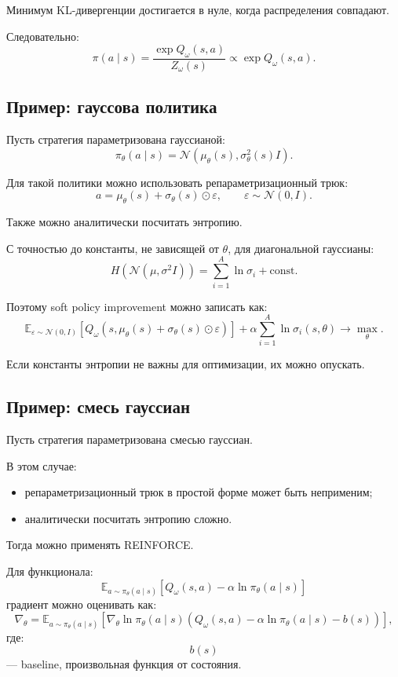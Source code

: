 \documentclass[12pt,a4paper]{article}
\begin{document}
Минимум KL-дивергенции достигается в нуле, когда распределения совпадают.

Следовательно:
\[
\pi(a\mid s)
=
\frac{
\exp Q_\omega(s,a)
}{
Z_\omega(s)
}
\propto
\exp Q_\omega(s,a).
\]

\subsection{Пример: гауссова политика}

Пусть стратегия параметризована гауссианой:
\[
\pi_\theta(a\mid s)
=
\mathcal N
\left(
\mu_\theta(s),
\sigma_\theta^2(s)I
\right).
\]

Для такой политики можно использовать репараметризационный трюк:
\[
a
=
\mu_\theta(s)
+
\sigma_\theta(s)\odot\varepsilon,
\qquad
\varepsilon\sim\mathcal N(0,I).
\]

Также можно аналитически посчитать энтропию.

С точностью до константы, не зависящей от $\theta$, для диагональной гауссианы:
\[
H
\left(
\mathcal N(\mu,\sigma^2 I)
\right)
=
\sum_{i=1}^{A}
\ln\sigma_i
+
\mathrm{const}.
\]

Поэтому soft policy improvement можно записать как:
\[
\mathbb E_{\varepsilon\sim\mathcal N(0,I)}
\left[
Q_\omega
\left(
s,
\mu_\theta(s)+\sigma_\theta(s)\odot\varepsilon
\right)
\right]
+
\alpha
\sum_{i=1}^{A}
\ln\sigma_i(s,\theta)
\to
\max_{\theta}.
\]

Если константы энтропии не важны для оптимизации, их можно опускать.

\subsection{Пример: смесь гауссиан}

Пусть стратегия параметризована смесью гауссиан.

В этом случае:
\begin{itemize}
    \item репараметризационный трюк в простой форме может быть неприменим;
    \item аналитически посчитать энтропию сложно.
\end{itemize}

Тогда можно применять REINFORCE.

Для функционала:
\[
\mathbb E_{a\sim\pi_\theta(a\mid s)}
\left[
Q_\omega(s,a)
-
\alpha\ln\pi_\theta(a\mid s)
\right]
\]
градиент можно оценивать как:
\[
\nabla_\theta
=
\mathbb E_{a\sim\pi_\theta(a\mid s)}
\left[
\nabla_\theta
\ln\pi_\theta(a\mid s)
\left(
Q_\omega(s,a)
-
\alpha\ln\pi_\theta(a\mid s)
-
b(s)
\right)
\right],
\]
где:
\[
b(s)
\]
--- baseline, произвольная функция от состояния.
\end{document}

